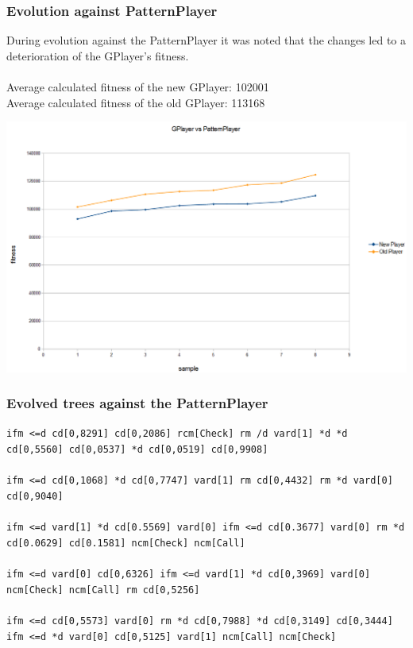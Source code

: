 \documentclass[12pt,fleqn,a4paper]{article}
\begin{document}
\subsubsection{Evolution against PatternPlayer}
During evolution against the PatternPlayer it was noted that the changes led to a deterioration of the GPlayer's fitness.\\
\\
Average calculated fitness of the new GPlayer: 102001\\
Average calculated fitness of the old GPlayer: 113168
\begin{center}
	\includegraphics[width=.9\textwidth]{gp_vs_pp_1.png}
\end{center}

\subsubsection{Evolved trees against the PatternPlayer}
\texttt{ifm <=d cd[0,8291] cd[0,2086] rcm[Check] rm /d vard[1] *d *d cd[0,5560] cd[0,0537] *d cd[0,0519] cd[0,9908]} \\ \\
\texttt{ifm <=d cd[0,1068] *d cd[0,7747] vard[1] rm cd[0,4432] rm *d vard[0] cd[0,9040]}\\ \\
\texttt{ifm <=d vard[1] *d cd[0.5569] vard[0] ifm <=d cd[0.3677] vard[0] rm *d cd[0.0629] cd[0.1581] ncm[Check] ncm[Call]}\\ \\
\texttt{ifm <=d vard[0] cd[0,6326] ifm <=d vard[1] *d cd[0,3969] vard[0] ncm[Check] ncm[Call] rm cd[0,5256]}\\ \\
\texttt{ifm <=d cd[0,5573] vard[0] rm *d cd[0,7988] *d cd[0,3149] cd[0,3444] ifm <=d *d vard[0] cd[0,5125] vard[1] ncm[Call] ncm[Check]}
\end{document}
